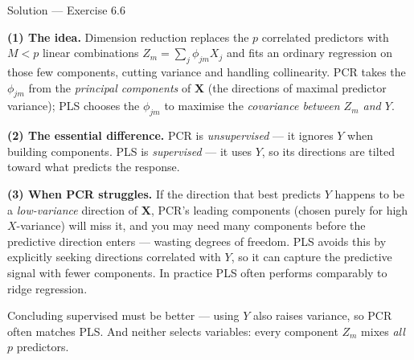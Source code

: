 \documentclass[aspectratio=169,11pt]{beamer}
\begin{document}
\begin{frame}{Solution --- Exercise 6.6}
  \begin{solutionbox}
    \textbf{(1) The idea.}
    Dimension reduction replaces the $p$ correlated predictors with
    $M < p$ linear combinations $Z_m = \sum_j \phi_{jm}X_j$ and fits an
    ordinary regression on those few components, cutting variance and
    handling collinearity. PCR takes the $\phi_{jm}$ from the
    \emph{principal components} of $\mathbf{X}$ (the directions of
    maximal predictor variance); PLS chooses the $\phi_{jm}$ to maximise
    the \emph{covariance between $Z_m$ and $Y$}.

    \textbf{(2) The essential difference.}
    PCR is \emph{unsupervised} --- it ignores $Y$ when building
    components. PLS is \emph{supervised} --- it uses $Y$, so its
    directions are tilted toward what predicts the response.

    \textbf{(3) When PCR struggles.}
    If the direction that best predicts $Y$ happens to be a
    \emph{low-variance} direction of $\mathbf{X}$, PCR's leading
    components (chosen purely for high $X$-variance) will miss it, and
    you may need many components before the predictive direction enters
    --- wasting degrees of freedom. PLS avoids this by explicitly
    seeking directions correlated with $Y$, so it can capture the
    predictive signal with fewer components. In practice PLS often
    performs comparably to ridge regression.
  \end{solutionbox}
  \begin{mistake}
    Concluding supervised must be better --- using $Y$ also raises
    variance, so PCR often matches PLS. And neither selects variables:
    every component $Z_m$ mixes \emph{all} $p$ predictors.
  \end{mistake}
\end{frame}
\end{document}
